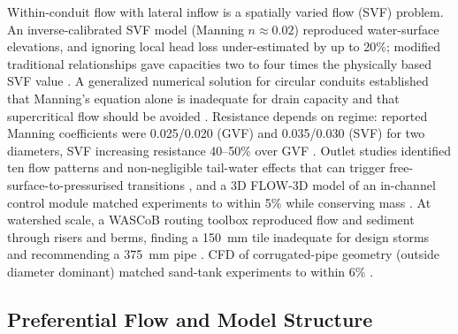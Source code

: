 Within-conduit flow with lateral inflow is a spatially varied flow (SVF) problem. An inverse-calibrated SVF model (Manning $n\approx0.02$) reproduced water-surface elevations, and ignoring local head loss under-estimated by up to 20\%; modified traditional relationships gave capacities two to four times the physically based SVF value \parencite{Bayat2011}. A generalized numerical solution for circular conduits established that Manning's equation alone is inadequate for drain capacity and that supercritical flow should be avoided \parencite{Graber2004}. Resistance depends on regime: reported Manning coefficients were 0.025/0.020 (GVF) and 0.035/0.030 (SVF) for two diameters, SVF increasing resistance 40--50\% over GVF \parencite{Kouchakzadeh2011}. Outlet studies identified ten flow patterns and non-negligible tail-water effects that can trigger free-surface-to-pressurised transitions \parencite{Nédélec2008}, and a 3D FLOW-3D model of an in-channel control module matched experiments to within 5\% while conserving mass \parencite{Abdurrasheed2019}. At watershed scale, a WASCoB routing toolbox reproduced flow and sediment through risers and berms, finding a 150~mm tile inadequate for design storms and recommending a 375~mm pipe \parencite{Gupta2019}. CFD of corrugated-pipe geometry (outside diameter dominant) matched sand-tank experiments to within 6\% \parencite{Wu2022}.

\subsection{Preferential Flow and Model Structure}

